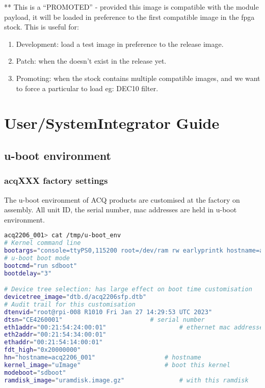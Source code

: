 \documentclass[]{article}
\begin{document}
** This is a “PROMOTED”  - provided this image is compatible with the module payload, it will be loaded in preference to the first compatible image in the fpga stock. This is useful for:
\begin{enumerate}
    \item Development: load a test image in preference to the release image.
    \item Patch: when the  doesn’t exist in the release yet.
    \item Promoting: when the stock contains multiple compatible images, and we want to force a particular  to load eg: DEC10 filter.
\end{enumerate}

\pagebreak
\section{User/SystemIntegrator Guide}

\subsection{u-boot environment}

\subsubsection{acqXXX factory settings}

The u-boot environment of ACQ products are customised at the factory on assembly.
All unit ID, the serial number, mac addresses are held in u-boot environment.

\begin{lstlisting}[language=bash,style=bashstyle,frame=single]
acq2206_001> cat /tmp/u-boot_env 
# Kernel command line
bootargs="console=ttyPS0,115200 root=/dev/ram rw earlyprintk hostname=acq2206_001" 
# u-boot boot mode
bootcmd="run sdboot"
bootdelay="3"

# Device tree selection: has large effect on boot time customisation
devicetree_image="dtb.d/acq2206sfp.dtb"
# Audit trail for this customisation
dtenvid="root@rpi-008 R1010 Fri Jan 27 14:29:53 UTC 2023"
dtsn="CE4260001"						# serial number
eth1addr="00:21:54:24:00:01"					# ethernet mac addresses
eth2addr="00:21:54:34:00:01"
ethaddr="00:21:54:14:00:01"
fdt_high="0x20000000"
hn="hostname=acq2206_001"					# hostname
kernel_image="uImage"						# boot this kernel
modeboot="sdboot"
ramdisk_image="uramdisk.image.gz"				# with this ramdisk
\end{lstlisting}
\end{document}
